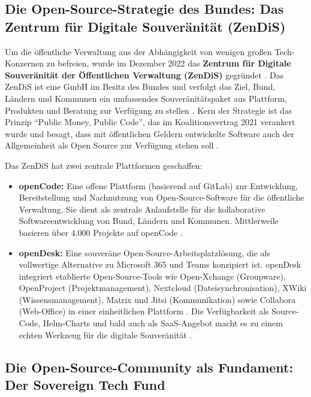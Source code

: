 \documentclass[12pt,a4paper]{article}
\begin{document}
	\subsection{Die Open-Source-Strategie des Bundes: Das Zentrum für Digitale Souveränität (ZenDiS)}
	
	Um die öffentliche Verwaltung aus der Abhängigkeit von wenigen großen Tech-Konzernen zu befreien, wurde im Dezember 2022 das \textbf{Zentrum für Digitale Souveränität der Öffentlichen Verwaltung (ZenDiS)} gegründet \cite{ZenDiS2025}. Das ZenDiS ist eine GmbH im Besitz des Bundes und verfolgt das Ziel, Bund, Ländern und Kommunen ein umfassendes Souveränitätspaket aus Plattform, Produkten und Beratung zur Verfügung zu stellen \cite{ZenDiS2025}. Kern der Strategie ist das Prinzip \enquote{Public Money, Public Code}, das im Koalitionsvertrag 2021 verankert wurde und besagt, dass mit öffentlichen Geldern entwickelte Software auch der Allgemeinheit als Open Source zur Verfügung stehen soll \cite{SovereignTechFund2025}.
	
	Das ZenDiS hat zwei zentrale Plattformen geschaffen:
	\begin{itemize}
		\item \textbf{openCode:} Eine offene Plattform (basierend auf GitLab) zur Entwicklung, Bereitstellung und Nachnutzung von Open-Source-Software für die öffentliche Verwaltung. Sie dient als zentrale Anlaufstelle für die kollaborative Softwareentwicklung von Bund, Ländern und Kommunen. Mittlerweile basieren über 4.000 Projekte auf openCode \cite{Heise2025a}.
		\item \textbf{openDesk:} Eine souveräne Open-Source-Arbeitsplatzlösung, die als vollwertige Alternative zu Microsoft 365 und Teams konzipiert ist. openDesk integriert etablierte Open-Source-Tools wie Open-Xchange (Groupware), OpenProject (Projektmanagement), Nextcloud (Dateisynchronisation), XWiki (Wissensmanagement), Matrix und Jitsi (Kommunikation) sowie Collabora (Web-Office) in einer einheitlichen Plattform \cite{AllThingsOpen2025}. Die Verfügbarkeit als Source-Code, Helm-Charts und bald auch als SaaS-Angebot macht es zu einem echten Werkzeug für die digitale Souveränität \cite{AllThingsOpen2025}.
	\end{itemize}
	
	\subsection{Die Open-Source-Community als Fundament: Der Sovereign Tech Fund}
	
\end{document}
